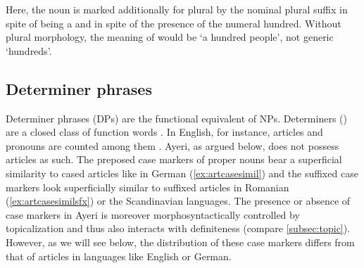 Here, the noun  is marked additionally for plural
by the nominal plural suffix  in spite of being a  and in spite of the presence of the numeral 
{hundred}. Without plural morphology, the meaning of  would be `a hundred people', not generic `hundreds'.


\subsection{Determiner phrases}
\label{subsec:dps}

Determiner phrases (DPs) are the functional equivalent of NPs. Determiners
() are a closed class of function words \citep[102]{bresnan2016}. In
English, for instance, articles and pronouns are counted among them
\citep[208--211]{carnie2013}. Ayeri, as argued below, does not possess articles
as such. The preposed case markers of proper nouns bear a superficial
similarity to cased articles like in German (\ref{ex:artcasesimil}) and the
suffixed case markers look superficially similar to suffixed articles in
Romanian (\ref{ex:artcasesimilsfx}) or the Scandinavian languages. The presence
or absence of case markers in Ayeri is moreover morphosyntactically controlled
by topicalization and thus also interacts with definiteness (compare
\autoref{subsec:topic}). However, as we will
see below, the distribution of these case markers differs from that of
articles in languages like English or German.

